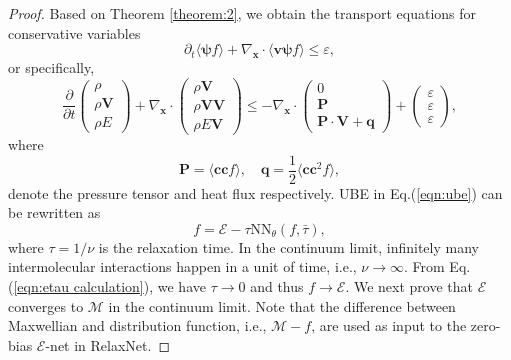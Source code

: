 \documentclass[preprint,3p,12pt,sort&compress]{elsarticle}
\begin{document}
\begin{proof}
Based on Theorem \ref{theorem:2}, we obtain the transport equations for conservative variables
\begin{equation}
    \partial_t \langle \boldsymbol\psi f \rangle + \nabla_\mathbf x \cdot \langle \mathbf v \boldsymbol\psi f \rangle \leq \varepsilon,
    \label{eqn:ube macro}
\end{equation}
or specifically,
\begin{equation}
    \frac{\partial}{\partial t}\left(\begin{array}{c}
    \rho \\
    \rho \mathbf{V} \\
    \rho E
    \end{array}\right)+\nabla_{\mathbf{x}} \cdot\left(\begin{array}{c}
    \rho \mathbf{V} \\
    \rho \mathbf{V} \mathbf{V} \\
    \rho E \mathbf{V}
    \end{array}\right) \leq -\nabla_\mathbf x \cdot
    \left(\begin{array}{c}
    0 \\
    \mathbf P \\
    \mathbf P \cdot \mathbf V + \mathbf q
    \end{array}\right) + \left(\begin{array}{c}
    \varepsilon \\
    \varepsilon \\
    \varepsilon
    \end{array}\right),
\end{equation}
where
\begin{equation}
    \mathbf P = \langle \mathbf c \mathbf c f \rangle,\quad \mathbf q = \frac{1}{2} \langle \mathbf c \mathbf c^2 f \rangle,
\end{equation}
denote the pressure tensor and heat flux respectively.
UBE in Eq.(\ref{eqn:ube}) can be rewritten as
\begin{equation}
    f = \mathcal E - \tau \mathrm{NN}_\theta(f,\bar\tau),
\end{equation}
where $\tau=1/\nu$ is the relaxation time.
In the continuum limit, infinitely many intermolecular interactions happen in a unit of time, i.e., $\nu\rightarrow\infty$.
From Eq.(\ref{eqn:etau calculation}), we have $\tau\rightarrow 0$ and thus $f\rightarrow \mathcal E$.
We next prove that $\mathcal E$ converges to $\mathcal M$ in the continuum limit.
Note that the difference between Maxwellian and distribution function, i.e., $\mathcal M - f$, are used as input to the zero-bias $\mathcal E$-net in RelaxNet.

\end{proof}
\end{document}
